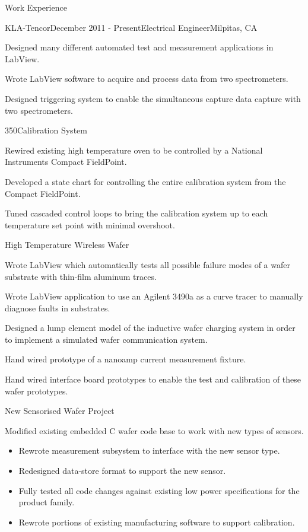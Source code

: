 \documentclass{resume} %
\begin{document}
\begin{rSection}{Work Experience}

\begin{rSubsection}{KLA-Tencor}{December 2011 - Present}{Electrical Engineer}{Milpitas, CA}
\smallskip
\item Designed many different automated test and measurement applications in LabView.
\item Wrote LabView software to acquire and process data from two spectrometers.
\item Designed triggering system to enable the simultaneous capture data capture with two spectrometers.

\begin{rWorkProject}{350\celsius \space Calibration System}
\item Rewired existing high temperature oven to be controlled by a National Instruments Compact FieldPoint.
\item Developed a state chart for controlling the entire calibration system from the Compact FieldPoint.
\item Tuned cascaded control loops to bring the calibration system up to each temperature set point with minimal overshoot.
\end{rWorkProject}

\begin{rWorkProject}{High Temperature Wireless Wafer}
\item Wrote LabView which automatically tests all possible failure modes of a wafer substrate with thin-film aluminum traces.
\item Wrote LabView application to use an Agilent 3490a as a curve tracer to manually diagnose faults in substrates.
\item Designed a lump element model of the inductive wafer charging system in order to implement a simulated wafer communication system.
\item Hand wired prototype of a nanoamp current measurement fixture.
\item Hand wired interface board prototypes to enable the test and calibration of these wafer prototypes.
\end{rWorkProject}

\begin{rWorkProject}{New Sensorised Wafer Project}
\item Modified existing embedded C wafer code base to work with new types of sensors.
\begin{itemize}
\itemsep -0.5em \vspace{-0.5em}
\renewcommand{\labelitemi}{-}
\item Rewrote measurement subsystem to interface with the new sensor type.
\item Redesigned data-store format to support the new sensor.
\item Fully tested all code changes against existing low power specifications for the product family.
\item Rewrote portions of existing manufacturing software to support calibration.
\end{itemize}


\end{rWorkProject}
\end{rSubsection}
\end{rSection}
\end{document}
